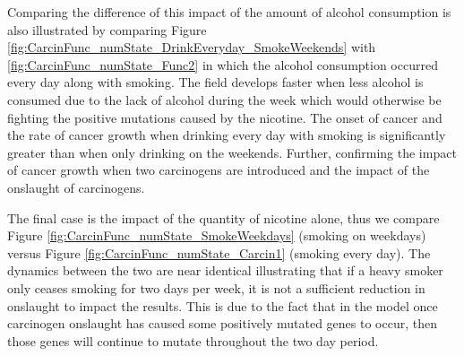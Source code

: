 \documentclass[\main/thesis.tex]{subfiles}
\begin{document}
Comparing the difference of this impact of the amount of alcohol consumption is also illustrated by comparing Figure \ref{fig:CarcinFunc_numState_DrinkEveryday_SmokeWeekends} with \ref{fig:CarcinFunc_numState_Func2} in which the alcohol consumption occurred every day along with smoking. The field develops faster when less alcohol is consumed due to the lack of alcohol during the week which would otherwise be fighting the positive mutations caused by the nicotine. The onset of cancer and the rate of cancer growth when drinking every day with smoking is significantly greater than when only drinking on the weekends. Further, confirming the impact of cancer growth when two carcinogens are introduced and the impact of the onslaught of carcinogens.

The final case is the impact of the quantity of nicotine alone, thus we compare Figure \ref{fig:CarcinFunc_numState_SmokeWeekdays} (smoking on weekdays) versus Figure \ref{fig:CarcinFunc_numState_Carcin1} (smoking every day). The dynamics between the two are near identical illustrating that if a heavy smoker only ceases smoking for two days per week, it is not a sufficient reduction in onslaught to impact the results. This is due to the fact that in the model once carcinogen onslaught has caused some positively mutated genes to occur, then those genes will continue to mutate throughout the two day period.  
\end{document}

